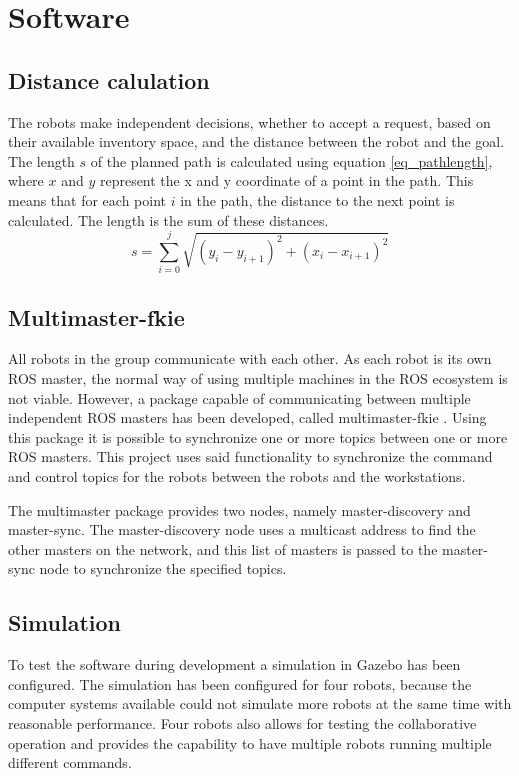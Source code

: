 \documentclass[10pt, journal]{IEEEtran}
\begin{document}
\section{Software}

\subsection{Distance calulation}
The robots make independent decisions, whether to accept a request, based on their available inventory space, and the distance between the robot and the goal. The length $s$ of the planned path is calculated using equation \ref{eq_pathlength}, where $x$ and $y$ represent the x and y coordinate of a point in the path. This means that for each point $i$ in the path, the distance to the next point is calculated. The length is the sum of these distances.
\begin{equation}
\label{eq_pathlength}
s= \sum\limits_{i=0}^j \sqrt{(y_i - y_{i+1})^2 + (x_i - x_{i+1})^2}
\end{equation}

\subsection{Multimaster-fkie}
All robots in the group communicate with each other. As each robot is its own ROS master, the normal way of using multiple machines \cite{ROSMultipleMachines} in the ROS ecosystem is not viable. However, a package capable of communicating between multiple independent ROS masters has been developed, called multimaster-fkie \cite{Multimaster-fkie}. Using this package it is possible to synchronize one or more topics between one or more ROS masters. This project uses said functionality to synchronize the command and control topics for the robots between the robots and the workstations.

The multimaster package provides two nodes, namely master-discovery and master-sync. The master-discovery node uses a multicast address to find the other masters on the network, and this list of masters is passed to the master-sync node to synchronize the specified topics.
\subsection{Simulation}
To test the software during development a simulation in Gazebo\cite{Gazebo} has been configured\cite{MultipleRobots}. The simulation has been configured for four robots, because the computer systems available could not simulate more robots at the same time with reasonable performance. Four robots also allows for testing the collaborative operation and provides the capability to have multiple robots running multiple different commands.
\end{document}
